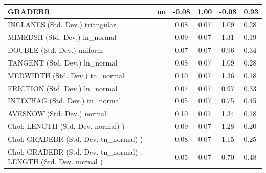 \begin{table}
\begin{center}
\begin{tabular}{|l|l|c|c|c|l|}
			GRADEBR & no & -0.08 & 1.00 & -0.08 & 0.93 \\
			\hline
			INCLANES (Std. Dev.) triangular &  & 0.08 & 0.07 & 1.09 & 0.28 \\
			\hline
			MIMEDSH (Std. Dev.) ln_normal &  & 0.09 & 0.07 & 1.31 & 0.19 \\
			\hline
			DOUBLE (Std. Dev.) uniform &  & 0.07 & 0.07 & 0.96 & 0.34 \\
			\hline
			TANGENT (Std. Dev.) ln_normal &  & 0.08 & 0.07 & 1.09 & 0.28 \\
			\hline
			MEDWIDTH (Std. Dev.) tn_normal &  & 0.10 & 0.07 & 1.36 & 0.18 \\
			\hline
			FRICTION (Std. Dev.) ln_normal &  & 0.07 & 0.07 & 0.97 & 0.33 \\
			\hline
			INTECHAG (Std. Dev.) tn_normal &  & 0.05 & 0.07 & 0.75 & 0.45 \\
			\hline
			AVESNOW (Std. Dev.) normal &  & 0.10 & 0.07 & 1.34 & 0.18 \\
			\hline
			 Chol: LENGTH (Std. Dev. normal) ) &  & 0.09 & 0.07 & 1.28 & 0.20 \\
			\hline
			 Chol: GRADEBR (Std. Dev. tn_normal) ) &  & 0.08 & 0.07 & 1.15 & 0.25 \\
			\hline
			 Chol: GRADEBR (Std. Dev. tn_normal) . LENGTH (Std. Dev.   normal ) &  & 0.05 & 0.07 & 0.70 & 0.48 \\
			\hline
		\end{tabular}
	\end{center}
\end{table}